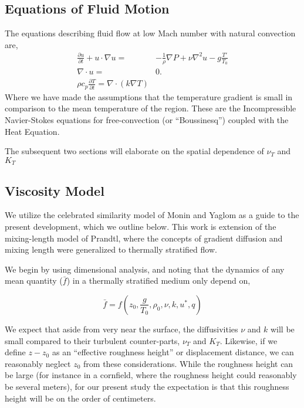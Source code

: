 \subsection{Equations of Fluid Motion}
%
%

The equations describing fluid flow at
low Mach number with natural convection are, 
\begin{eqnarray*}
 \frac{\partial u}{\partial t} + u \cdot \nabla u =&
  -\frac{1}{\rho}\nabla P + \nu \nabla^2 u - g \frac{T'}{T_0}\\
 \nabla \cdot u =& 0. \\
 \rho c_p \frac{\partial T}{\partial t} = \nabla \cdot ( k \nabla T) 
\end{eqnarray*} 
Where we have made the assumptions that the temperature gradient is small in
comparison to the mean temperature of the region. These are the
Incompressible Navier-Stokes equations for free-convection (or
``Boussinesq'') coupled with the Heat Equation. 

%
%
%



The subsequent two sections will elaborate on the spatial dependence of
$\nu_T$ and $K_T$

\subsection{Viscosity Model}

We utilize the celebrated similarity model of Monin and Yaglom\cite{} as
a guide to the present development, which we outline below. This work is
extension of the mixing-length model of Prandtl, where the concepts of
gradient diffusion and mixing length were generalized to thermally
stratified flow.  
%
%

We begin by using dimensional analysis, and noting that the dynamics of
any mean quantity ($\bar f$) in a thermally stratified medium only depend on,

\begin{equation}
\bar f = f(z_0,\frac{g}{T_0},\rho_0,\nu,k,u^*,q)
\end{equation}

We expect that aside from very near the surface, the diffusivities $\nu$
and $k$ will be small compared to their turbulent counter-parts, $\nu_T$
and $K_T$. Likewise, if we define $z-z_0$ as an ``effective roughness
height'' or displacement distance, we can reasonably neglect $z_0$ from these
considerations. While the roughness height can be large (for instance in
a cornfield, where the roughness height could reasonably be several
meters), for our present study the expectation is that this roughness
height will be on the order of centimeters\cite{}. 

